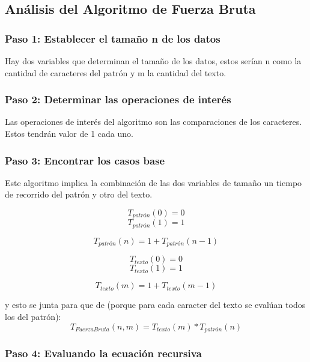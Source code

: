 \subsection*{Análisis del Algoritmo de Fuerza Bruta}

\subsubsection*{Paso 1: Establecer el tamaño n de los datos}
Hay dos variables que determinan el tamaño de los datos, estos serían n como la cantidad de caracteres del patrón y m la cantidad del texto.

\subsubsection*{Paso 2: Determinar las operaciones de interés}
Las operaciones de interés del algoritmo son las comparaciones de los caracteres. Estos tendrán valor de 1 cada uno.

\subsubsection*{Paso 3: Encontrar los casos base}
Este algoritmo implica la combinación de las dos variables de tamaño un tiempo de recorrido del patrón y otro del texto.

\[T_{patrón}(0) =  0\]
\[T_{patrón}(1) = 1\]

\[T_{patrón}(n) = 1 + T_{patrón}(n-1)\]

\[T_{texto}(0) =  0\]
\[T_{texto}(1) = 1\]

\[T_{texto}(m) = 1 + T_{texto}(m-1)\]

y esto se junta para que de (porque para cada caracter del texto se evalúan todos los del patrón):
\[T_{Fuerza Bruta}(n,m) = T_{texto}(m) * T_{patrón}(n)\]

\subsubsection*{Paso 4: Evaluando la ecuación recursiva}

